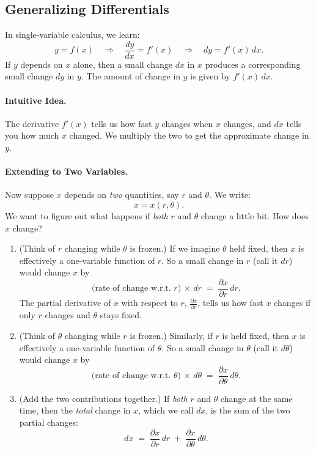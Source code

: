 \documentclass[11pt,openany]{article}
\begin{document}
\subsection{Generalizing Differentials}
In single-variable calculus, we learn: \[
y = f(x) \quad\Longrightarrow\quad \frac{dy}{dx}=f'(x)
\quad\Longrightarrow\quad dy = f'(x)\,dx.
\] If \(y\) depends on \(x\) alone, then a small change \(dx\) in \(x\) produces a corresponding small change \(dy\) in \(y\). The amount of change in \(y\) is given by \(f'(x)\,dx\).
\vfill
\paragraph{Intuitive Idea.}
The derivative \(f'(x)\) tells us how fast \(y\) changes when \(x\) changes, and \(dx\) tells you how much \(x\) changed. We multiply the two to get the approximate change in \(y\).\ \\
\vfill
\paragraph{Extending to Two Variables.}
Now suppose \(x\) depends on \emph{two} quantities, say \(r\) and \(\theta\). We write: \[
x = x(r, \theta).
\]
We want to figure out what happens if \emph{both} \(r\) and \(\theta\) change a little bit. How does \(x\) change?
\newpage
\begin{enumerate}
	\item (Think of \(r\) changing while \(\theta\) is frozen.) \; If we imagine \(\theta\) held fixed, then \(x\) is effectively a one-variable function of \(r\). So a small change in \(r\) (call it \(dr\)) would change \(x\) by 
	\[
	\bigl(\text{rate of change w.r.t. }r\bigr)\,\times\,dr
	\;=\;
	\frac{\partial x}{\partial r} \, dr.
	\]
	The partial derivative of \(x\) with respect to \(r\), \(\displaystyle\frac{\partial x}{\partial r}\), tells us how fast \(x\) changes if only \(r\) changes and \(\theta\) stays fixed.
	\item (Think of \(\theta\) changing while \(r\) is frozen.)\; Similarly, if \(r\) is held fixed, then \(x\) is effectively a one-variable function of \(\theta\). So a small change in \(\theta\) (call it \(d\theta\)) would change \(x\) by 
	\[
	\bigl(\text{rate of change w.r.t. }\theta\bigr)\,\times\,d\theta
	\;=\;
	\frac{\partial x}{\partial \theta} \, d\theta.
	\]
	\item (Add the two contributions together.) \; If \emph{both} \(r\) and \(\theta\) change at the same time, then the \emph{total} change in \(x\), which we call \(dx\), is the sum of the two partial changes: \[
	dx
	\;=\;
	\frac{\partial x}{\partial r}\,dr
	\;+\;
	\frac{\partial x}{\partial \theta}\,d\theta.
	\]
\end{enumerate}
\end{document}
